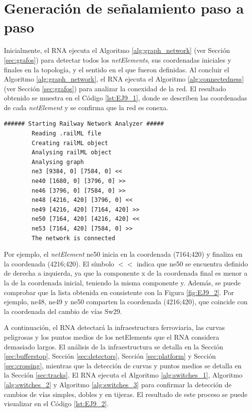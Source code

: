 \section{Generación de señalamiento paso a paso}

	Inicialmente, el RNA ejecuta el Algoritmo \ref{alg:graph_network} (ver Sección \ref{sec:grafos}) para detectar todos los \textit{netElements}, sus coordenadas iniciales y finales en la topología, y el sentido en el que fueron definidas. Al concluir el Algoritmo \ref{alg:graph_network}, el RNA ejecuta el Algoritmo \ref{alg:connectedness} (ver Sección \ref{sec:grafos}) para analizar la conexidad de la red. El resultado obtenido se muestra en el Código \ref{lst:EJ9_1}, donde se describen las coordenadas de cada \textit{netElement} y se confirma que la red es conexa.
	
	\begin{lstlisting}[language = {}, caption = Detección de \textit{netElements} por parte del RNA , label = {lst:EJ9_1}]
		###### Starting Railway Network Analyzer #####
		Reading .railML file
		Creating railML object
		Analysing railML object
		Analysing graph
		ne3 [9384, 0] [7584, 0] <<
		ne40 [1680, 0] [3796, 0] >>
		ne46 [3796, 0] [7584, 0] >>
		ne48 [4216, 420] [3796, 0] <<
		ne49 [4216, 420] [7164, 420] >>
		ne50 [7164, 420] [4216, 420] <<
		ne53 [7164, 420] [7584, 0] >>
		The network is connected
	\end{lstlisting}
	
	Por ejemplo, el \textit{netElement} ne50 inicia en la coordenada (7164;420) y finaliza en la coordenada (4216;420). El símbolo $<<$ indica que ne50 se encuentra definido de derecha a izquierda, ya que la componente x de la coordenada final es menor a la de la coordenada inicial, teniendo la misma componente y. Además, se puede comprobar que la lista obtenida en consistente con la Figura \ref{fig:EJ9_2}. Por ejemplo, ne48, ne49 y ne50 comparten la coordenada (4216;420), que coincide con la coordenada del cambio de vías Sw29.
	
	A continuación, el RNA detectará la infraestructura ferroviaria, las curvas peligrosas y los puntos medios de los netElements que el RNA considera demasiado largos. El análisis de la infraestructura se detalla en la Sección \ref{sec:bufferstop}, Sección \ref{sec:detectors}, Sección \ref{sec:platform} y Sección \ref{sec:crossing}, mientras que la detección de curvas y puntos medios se detalla en la Sección \ref{sec:tracks}. El RNA ejecuta el Algoritmo \ref{alg:switches_1}, Algoritmo \ref{alg:switches_2} y Algoritmo \ref{alg:switches_3} para confirmar la detección de cambios de vías simples, dobles y en tijeras. El resultado de este proceso se puede visualizar en el Código \ref{lst:EJ9_2}.
	
